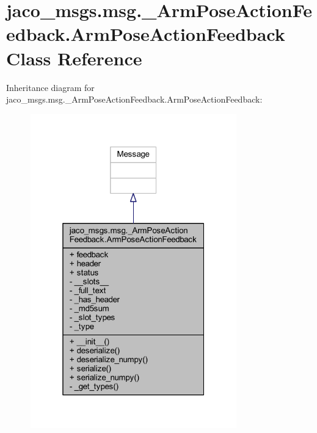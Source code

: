 \hypertarget{classjaco__msgs_1_1msg_1_1__ArmPoseActionFeedback_1_1ArmPoseActionFeedback}{}\section{jaco\+\_\+msgs.\+msg.\+\_\+\+Arm\+Pose\+Action\+Feedback.\+Arm\+Pose\+Action\+Feedback Class Reference}
\label{classjaco__msgs_1_1msg_1_1__ArmPoseActionFeedback_1_1ArmPoseActionFeedback}


Inheritance diagram for jaco\+\_\+msgs.\+msg.\+\_\+\+Arm\+Pose\+Action\+Feedback.\+Arm\+Pose\+Action\+Feedback\+:
\nopagebreak
\begin{figure}[H]
\begin{center}
\leavevmode
\includegraphics[width=253pt]{db/d2d/classjaco__msgs_1_1msg_1_1__ArmPoseActionFeedback_1_1ArmPoseActionFeedback__inherit__graph}
\end{center}
\end{figure}


